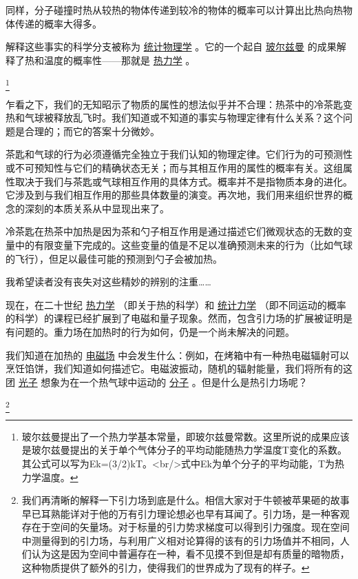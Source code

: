     同样，分子碰撞时热从较热的物体传递到较冷的物体的概率可以计算出比热向热物体传递的概率大得多。

    解释这些事实的科学分支被称为
\href{http://toyhouse.cc/wiki/index.php/统计物理学}{统计物理学}
。它的一个起自
\href{http://toyhouse.cc/wiki/index.php/玻尔兹曼}{玻尔兹曼}
的成果解释了热和温度的概率性——那就是
\href{http://toyhouse.cc/wiki/index.php/热力学}{热力学}
。

\footnote[3]
{玻尔兹曼提出了一个热力学基本常量，即玻尔兹曼常数。这里所说的成果应该是玻尔兹曼提出的关于单个气体分子的平均动能随热力学温度T变化的系数。其公式可以写为Ek=(3/2)kT。<br/>式中Ek为单个分子的平均动能，T为热力学温度。
}
 
   乍看之下，我们的无知昭示了物质的属性的想法似乎并不合理：热茶中的冷茶匙变热和气球被释放乱飞时。我们知道或不知道的事实与物理定律有什么关系？这个问题是合理的；而它的答案十分微妙。

    茶匙和气球的行为必须遵循完全独立于我们认知的物理定律。它们行为的可预测性或不可预知性与它们的精确状态无关；而与其相互作用的属性的概率有关。这组属性取决于我们与茶匙或气球相互作用的具体方式。概率并不是指物质本身的进化。它涉及到与我们相互作用的那些具体数量的演变。再次地，我们用来组织世界的概念的深刻的本质关系从中显现出来了。

    冷茶匙在热茶中加热是因为茶和勺子相互作用是通过描述它们微观状态的无数的变量中的有限变量下完成的。这些变量的值是不足以准确预测未来的行为（比如气球的飞行），但足以最佳可能的预测到勺子会被加热。

    我希望读者没有丧失对这些精妙的辨别的注重……

    现在，在二十世纪
\href{http://toyhouse.cc/wiki/index.php/热力学}{热力学}
（即关于热的科学）和
\href{http://toyhouse.cc/wiki/index.php/统计力学}{统计力学}
（即不同运动的概率的科学）的课程已经扩展到了电磁和量子现象。然而，包含引力场的扩展被证明是有问题的。重力场在加热时的行为如何，仍是一个尚未解决的问题。

    我们知道在加热的
\href{http://toyhouse.cc/wiki/index.php/电磁场}{电磁场}
中会发生什么：例如，在烤箱中有一种热电磁辐射可以烹饪馅饼，我们知道如何描述它。电磁波振动，随机的辐射能量，我们将所有的这团
\href{http://toyhouse.cc/wiki/index.php/光子}{光子}
想象为在一个热气球中运动的
\href{http://toyhouse.cc/wiki/index.php/分子}{分子}
。但是什么是热引力场呢？

\footnote[4]
{
我们再清晰的解释一下引力场到底是什么。相信大家对于牛顿被苹果砸的故事早已耳熟能详对于他的万有引力理论想必也早有耳闻了。引力场，是一种客观存在于空间的矢量场。对于标量的引力势求梯度可以得到引力强度。现在空间中测量得到的引力场，与利用广义相对论算得的该有的引力场值并不相同，人们认为这是因为空间中普遍存在一种，看不见摸不到但是却有质量的暗物质，这种物质提供了额外的引力，使得我们的世界成为了现有的样子。
}


